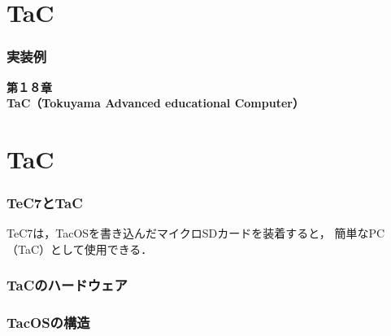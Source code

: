 \documentclass[handout]{beamer}                   %
\begin{document}
\section{TaC}
\begin{frame}
  \frametitle{実装例}
  \vfill
  \begin{center}
    \textbf{\LARGE 第１８章} \\
    \textbf{\LARGE TaC（Tokuyama Advanced educational Computer）}
  \end{center}
  \vfill
\end{frame}

\section{TaC}
\begin{frame}
  \frametitle{TeC7とTaC}
  \begin{minipage}{0.58\columnwidth}
  \end{minipage}
  \begin{minipage}{0.38\columnwidth}
  \end{minipage}
\vfill
TeC7は，TacOSを書き込んだマイクロSDカードを装着すると，
簡単なPC（TaC）として使用できる．
\end{frame}

\begin{frame}
  \frametitle{TaCのハードウェア}
\end{frame}

\begin{frame}
  \frametitle{TacOSの構造}
\end{frame}

\end{document}

